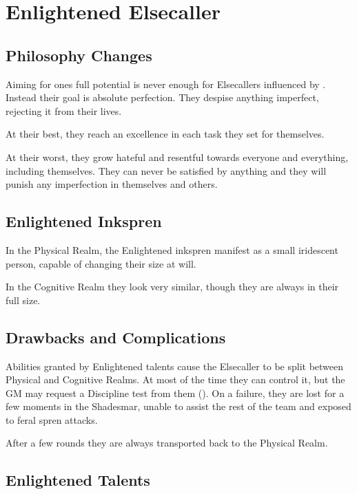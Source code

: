 \newpage
\section{Enlightened Elsecaller}


\subsection{Philosophy Changes}

Aiming for ones full potential is never enough for Elsecallers influenced by \npcSjaAnat{}. Instead their goal is absolute perfection. They despise anything imperfect, rejecting it from their lives.

At their best, they reach an excellence in each task they set for themselves.

At their worst, they grow hateful and resentful towards everyone and everything, including themselves. They can never be satisfied by anything and they will punish any imperfection in themselves and others.

\subsection{Enlightened Inkspren}

In the Physical Realm, the Enlightened inkspren manifest as a small iridescent person, capable of changing their size at will.

In the Cognitive Realm they look very similar, though they are always in their full size.

\subsection{Drawbacks and Complications}

Abilities granted by Enlightened talents cause the Elsecaller to be split between Physical and Cognitive Realms. At most of the time they can control it, but the GM may request a Discipline test from them (\corruptedResistanceDC{}). On a failure, they are lost for a few moments in the Shadesmar, unable to assist the rest of the team and exposed to feral spren attacks.

After a few rounds they are always transported back to the Physical Realm.

\subsection{Enlightened Talents}

